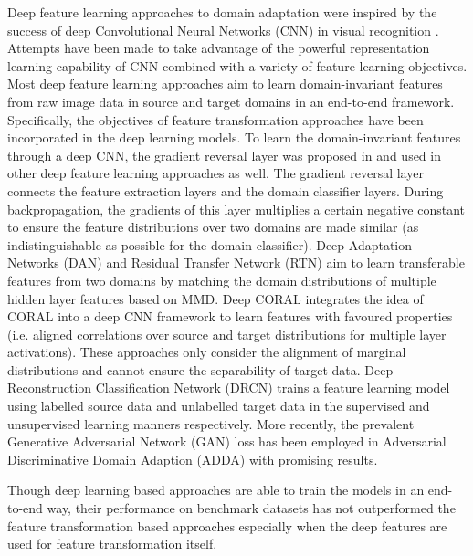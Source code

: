 \documentclass[conference]{IEEEtran}
\begin{document}
Deep feature learning approaches to domain adaptation were inspired by the success of deep Convolutional Neural Networks (CNN) in visual recognition \cite{lecun2015deep}. Attempts have been made to take advantage of the powerful representation learning capability of CNN combined with a variety of feature learning objectives. Most deep feature learning approaches aim to learn domain-invariant features from raw image data in source and target domains in an end-to-end framework. Specifically, the objectives of feature transformation approaches have been incorporated in the deep learning models. To learn the domain-invariant features through a deep CNN, the gradient reversal layer was proposed in \cite{ganin2015unsupervised} and used in other deep feature learning approaches \cite{ganin2016domain, pei2018multi, zhang2018collaborative} as well. The gradient reversal layer connects the feature extraction layers and the domain classifier layers. During backpropagation, the gradients of this layer multiplies a certain negative constant to ensure the feature distributions over two domains are made similar (as indistinguishable as possible for the domain classifier). Deep Adaptation Networks (DAN) \cite{long2015learning} and Residual Transfer Network (RTN) \cite{long2016unsupervised} aim to learn transferable features from two domains by matching the domain distributions of multiple hidden layer features based on MMD. Deep CORAL \cite{sun2016deep} integrates the idea of CORAL \cite{sun2016return} into a deep CNN framework to learn features with favoured properties (i.e. aligned correlations over source and target distributions for multiple layer activations). These approaches only consider the alignment of marginal distributions and cannot ensure the separability of target data. Deep Reconstruction Classification Network (DRCN) \cite{ghifary2016deep} trains a feature learning model using labelled source data and unlabelled target data in the supervised and unsupervised learning manners respectively. More recently, the prevalent Generative Adversarial Network (GAN) loss has been employed in Adversarial Discriminative Domain Adaption (ADDA) \cite{tzeng2017adversarial} with promising results. 

Though deep learning based approaches are able to train the models in an end-to-end way, their performance on benchmark datasets has not outperformed the feature transformation based approaches especially when the deep features are used for feature transformation itself.
\end{document}
